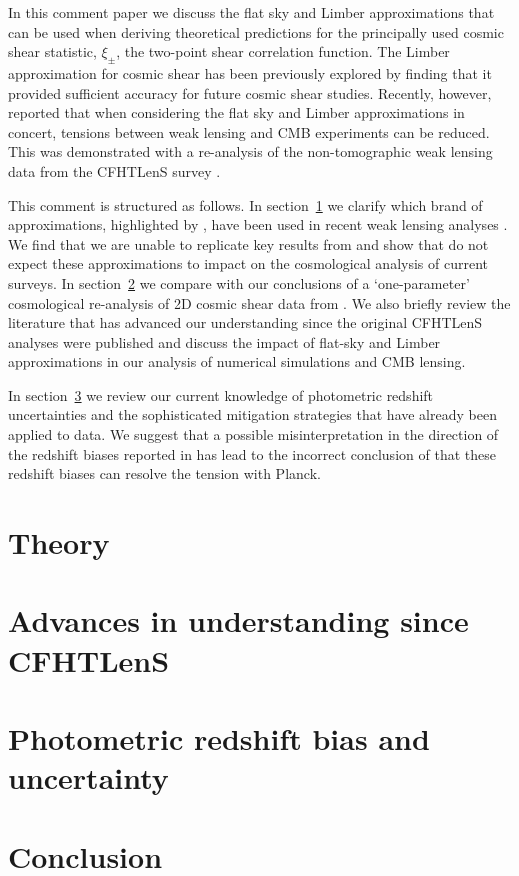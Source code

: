 \documentclass[preprint]{aastex}
\begin{document}
In this comment paper we discuss the flat sky and Limber approximations that can be used when deriving theoretical predictions for the principally used cosmic shear statistic, $\xi_\pm$, the two-point shear correlation function. The Limber approximation for cosmic shear has been previously explored by \citet{giannantonio/etal:2012} finding that it provided sufficient accuracy for future cosmic shear studies. Recently, however, \citet{kitching/etal:2016} reported that when considering the flat sky and Limber approximations in concert, tensions between weak lensing and CMB experiments can be reduced. This was demonstrated with a re-analysis of the non-tomographic weak lensing data from the CFHTLenS survey \citep{kilbinger/etal:2013}.    

This comment is structured as follows.  In section~\ref{sec:theory} we clarify which brand of approximations, highlighted by \citet{kitching/etal:2016}, have been used in recent weak lensing analyses \citep{joudaki/etal:2016, hildebrandt/etal:2016, joudaki/etal:2017}.  We find that we are unable to replicate key results from \citet{kitching/etal:2016} and show that do not expect these approximations to impact on the cosmological analysis of current surveys. In section~\ref{sec:cfhtlens} we compare with \citet{kitching/etal:2016} our conclusions of a `one-parameter' cosmological re-analysis of 2D cosmic shear data from \citet{kilbinger/etal:2013}.  We also briefly review the literature that has advanced our understanding since the original CFHTLenS analyses were published and discuss the impact of flat-sky and Limber approximations in our analysis of numerical simulations and CMB lensing.

In section~\ref{sec:photoz} we review our current knowledge of photometric redshift uncertainties and the sophisticated mitigation strategies that have already been applied to data.  We suggest that a possible misinterpretation in the direction of the redshift biases reported in \citet{choi/etal:2016} has lead to the incorrect conclusion of \citet{kitching/etal:2016} that these redshift biases can resolve the tension with Planck.  

\section{Theory}
\label{sec:theory}


\section{Advances in understanding since CFHTLenS}
\label{sec:cfhtlens}


\section{Photometric redshift bias and uncertainty}
\label{sec:photoz}


\section{Conclusion}
\label{sec:conclusion}




\end{document}
